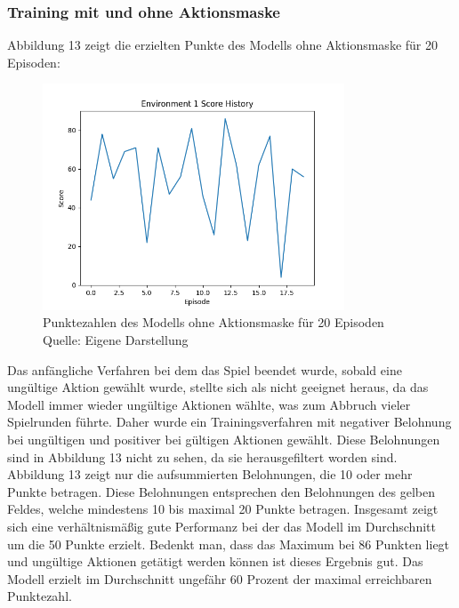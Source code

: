 \subsubsection{Training mit und ohne Aktionsmaske}
Abbildung 13 zeigt die erzielten Punkte des Modells ohne Aktionsmaske für 20 Episoden:
\nopagebreak
\begin{figure}[H]
	\centering
	\includegraphics[width=0.8\textwidth]{Bilder/trainingwithoutcancalation} 
	\caption[Punktezahlen des Modells ohne Aktionsmaske für 20 Episoden]{Punktezahlen des Modells ohne Aktionsmaske für 20 Episoden\\ Quelle: Eigene Darstellung}
\end{figure}

Das anfängliche Verfahren bei dem das Spiel beendet wurde, sobald eine ungültige Aktion gewählt wurde, stellte sich als nicht geeignet heraus, da das Modell immer wieder ungültige Aktionen wählte, was zum Abbruch vieler Spielrunden führte. Daher wurde ein Trainingsverfahren mit negativer Belohnung bei ungültigen und positiver bei gültigen Aktionen gewählt. Diese Belohnungen sind in Abbildung 13 nicht zu sehen, da sie herausgefiltert worden sind. Abbildung 13 zeigt nur die aufsummierten Belohnungen, die 10 oder mehr Punkte betragen. Diese Belohnungen entsprechen den Belohnungen des gelben Feldes, welche mindestens 10 bis maximal 20 Punkte betragen. Insgesamt zeigt sich eine verhältnismäßig gute Performanz bei der das Modell im Durchschnitt um die 50 Punkte erzielt. Bedenkt man, dass das Maximum bei 86 Punkten liegt und ungültige Aktionen getätigt werden können ist dieses Ergebnis gut. Das Modell erzielt im Durchschnitt ungefähr 60 Prozent der maximal erreichbaren Punktezahl.\\

